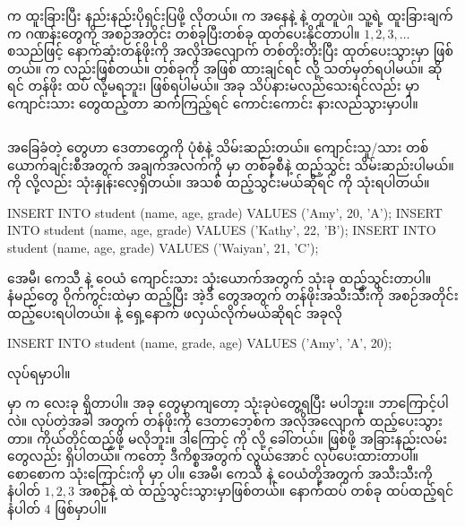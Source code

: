   က ထူးခြားပြီး နည်းနည်းပိုရှင်းပြဖို့ လိုတယ်။  က  အနေနဲ့  နဲ့ တူတူပဲ။ သူ့ရဲ့ ထူးခြားချက်က ဂဏန်းတွေကို အစဉ်အတိုင်း တစ်ခုပြီးတစ်ခု ထုတ်ပေးနိုင်တာပါ။ $1, 2, 3,\ldots$ စသည်ဖြင့်  နောက်ဆုံးတန်ဖိုးကို အလိုအလျောက် တစ်တိုးတိုးပြီး ထုတ်ပေးသွားမှာ ဖြစ်တယ်။   က  လည်းဖြစ်တယ်။  တစ်ခုကို  အဖြစ် ထားချင်ရင်  လို့ သတ်မှတ်ရပါမယ်။  ဆိုရင်  တန်ဖိုး ထပ်  လို့မရဘူး၊  ဖြစ်ရပါမယ်။ အခု သိပ်နားမလည်သေးရင်လည်း  မှာ ကျောင်းသား  တွေထည့်တာ ဆက်ကြည့်ရင် ကောင်းကောင်း နားလည်သွားမှာပါ။

\subsection*{}
 အခြေခံတဲ့  တွေဟာ ဒေတာတွေကို  ပုံစံနဲ့ သိမ်းဆည်းတယ်။ ကျောင်းသူ/သား တစ်ယောက်ချင်းစီအတွက် အချက်အလက်ကို  မှာ   တစ်ခုစီနဲ့ ထည့်သွင်း သိမ်းဆည်းပါမယ်။  ကို  လို့လည်း သုံးနှုန်းလေ့ရှိတယ်။  အသစ် ထည့်သွင်းမယ်ဆိုရင်   ကို သုံးရပါတယ်။

%
\begin{sql}
INSERT INTO student (name, age, grade) VALUES ('Amy', 20, 'A');
INSERT INTO student (name, age, grade) VALUES ('Kathy', 22, 'B');
INSERT INTO student (name, age, grade) VALUES ('Waiyan', 21, 'C');
\end{sql}
%

အေမီ၊ ကေသီ နဲ့ ဝေယံ ကျောင်းသား သုံးယောက်အတွက်  သုံးခု ထည့်သွင်းတာပါ။  နံမည်တွေ ဝိုက်ကွင်းထဲမှာ ထည့်ပြီး အဲ့ဒီ  တွေအတွက် တန်ဖိုးအသီးသီးကို အစဉ်အတိုင်း ထည့်ပေးရပါတယ်။  နဲ့  ရှေ့နောက် ဖလှယ်လိုက်မယ်ဆိုရင် အခုလို
%
\begin{sql}
INSERT INTO student (name, grade, age) VALUES ('Amy', 'A',  20);
\end{sql}
%
 လုပ်ရမှာပါ။

 မှာ  က လေးခု ရှိတာပါ။ အခု  တွေမှာကျတော့ သုံးခုပဲတွေ့ရပြီး  မပါဘူး။ ဘာကြောင့်ပါလဲ။  လုပ်တဲ့အခါ   အတွက် တန်ဖိုးကို ဒေတာဘေ့စ်က အလိုအလျောက် ထည့်ပေးသွားတာ။ ကိုယ်တိုင်ထည့်ဖို့ မလိုဘူး။ ဒါကြောင့်   ကို    လို့ ခေါ်တယ်။  ဖြစ်ဖို့ အခြားနည်းလမ်းတွေလည်း ရှိပါတယ်။  ကတော့ ဒီကိစ္စအတွက် လွယ်အောင် လုပ်ပေးထားတာပါ။ စောစောက  သုံးကြောင်းကို  မှာ  ပါ။ အေမီ၊ ကေသီ နဲ့ ဝေယံတို့အတွက်  အသီးသီးကို  နံပါတ် $1,2,3$ အစဉ်နဲ့  ထဲ ထည့်သွင်းသွားမှာဖြစ်တယ်။ နောက်ထပ်  တစ်ခု ထပ်ထည့်ရင်  နံပါတ် $4$ ဖြစ်မှာပါ။


